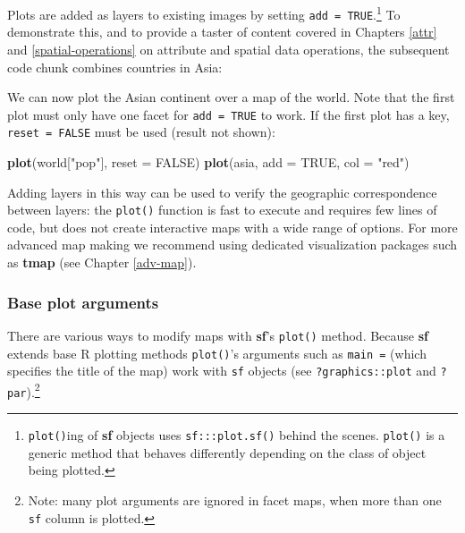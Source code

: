 \documentclass[]{krantz}
\newenvironment{Shaded}{\begin{snugshade}}{\end{snugshade}}
\newcommand{\DataTypeTok}[1]{\textcolor[rgb]{0.27,0.27,0.27}{#1}}
\newcommand{\KeywordTok}[1]{\textcolor[rgb]{0.27,0.27,0.27}{\textbf{#1}}}
\newcommand{\NormalTok}[1]{#1}
\newcommand{\OperatorTok}[1]{\textcolor[rgb]{0.43,0.43,0.43}{\textbf{#1}}}
\newcommand{\OtherTok}[1]{\textcolor[rgb]{0.37,0.37,0.37}{#1}}
\newcommand{\StringTok}[1]{\textcolor[rgb]{0.5,0.5,0.5}{#1}}
\let\rmarkdownfootnote\footnote%
\def\footnote{\protect\rmarkdownfootnote}
\begin{document}
Plots are added as layers to existing images by setting \texttt{add\ =\ TRUE}.\footnote{\texttt{plot()}ing of \textbf{sf} objects uses \texttt{sf:::plot.sf()} behind the scenes.
  \texttt{plot()} is a generic method that behaves differently depending on the class of object being plotted.}
To demonstrate this, and to provide a taster of content covered in Chapters \ref{attr} and \ref{spatial-operations} on attribute and spatial data operations, the subsequent code chunk combines countries in Asia:

\begin{Shaded}
\end{Shaded}

We can now plot the Asian continent over a map of the world.
Note that the first plot must only have one facet for \texttt{add\ =\ TRUE} to work.
If the first plot has a key, \texttt{reset\ =\ FALSE} must be used (result not shown):

\begin{Shaded}
\begin{Highlighting}[]
\KeywordTok{plot}\NormalTok{(world[}\StringTok{"pop"}\NormalTok{], }\DataTypeTok{reset =} \OtherTok{FALSE}\NormalTok{)}
\KeywordTok{plot}\NormalTok{(asia, }\DataTypeTok{add =} \OtherTok{TRUE}\NormalTok{, }\DataTypeTok{col =} \StringTok{"red"}\NormalTok{)}
\end{Highlighting}
\end{Shaded}

Adding layers in this way can be used to verify the geographic correspondence between layers:
the \texttt{plot()} function is fast to execute and requires few lines of code, but does not create interactive maps with a wide range of options.
For more advanced map making we recommend using dedicated visualization packages such as \textbf{tmap} (see Chapter \ref{adv-map}).

\hypertarget{base-args}{%
\subsubsection{Base plot arguments}\label{base-args}}

There are various ways to modify maps with \textbf{sf}'s \texttt{plot()} method.
Because \textbf{sf} extends base R plotting methods \texttt{plot()}'s arguments such as \texttt{main\ =} (which specifies the title of the map) work with \texttt{sf} objects (see \texttt{?graphics::plot} and \texttt{?par}).\footnote{Note: many plot arguments are ignored in facet maps, when more than one \texttt{sf} column is plotted.}
\end{document}
